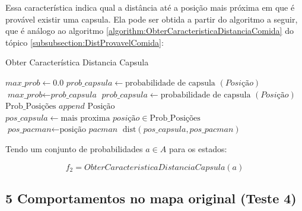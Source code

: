 Essa característica indica qual a distância até a posição mais próxima em que é provável existir uma capsula. Ela pode ser obtida a partir do algoritmo a seguir, que é análogo ao algoritmo \ref{algorithm:ObterCaracteristicaDistanciaComida} do tópico \ref{subsubsection:DistProvavelComida}:

\begin{algorithm}[H]
	\caption{Obter Característica Distancia Capsula} \label{algorithm:ObterCaracteristicaDistanciaCapsula}
	\begin{algorithmic}[1]
			\State $\textit{max\_prob} \gets 0.0 $
				\State $\textit{prob\_capsula} \gets \text{probabilidade de capsula } \left( \textit{Posição} \right) $
					\State $\textit{max\_prob} \gets \textit{prob\_capsula} $
				\EndIf 
			\EndFor
				\State $\textit{prob\_capsula} \gets \text{probabilidade de capsula } \left( \textit{Posição} \right) $
					\State $ \text{Prob\_Posições } append \text{ Posição} $
				\EndIf 
			\EndFor
			\State $\textit{pos\_capsula} \gets \text{mais proxima }\textit{posição} \in \text{Prob\_Posições} $
			\State $\textit{pos\_pacman} \gets \text{posição }\textit{pacman} $
			\State \Return $ \text{dist} \left( \textit{pos\_capsula}, \textit{pos\_pacman} \right) $
		\EndProcedure
	\end{algorithmic}
\end{algorithm}

Tendo um conjunto de probabilidades $ a \in A $ para os estados:

$$ f_2 = ObterCaracteristicaDistanciaCapsula \left( a \right) $$

\subsection{5 Comportamentos no mapa original (Teste 4)}
